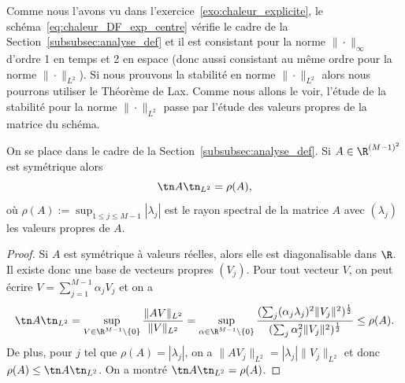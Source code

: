 \documentclass[12pt,a4paper,twoside]{article}
\begin{document}
Comme nous l'avons vu dans l'exercice~\ref{exo:chaleur_explicite},
le sch\'ema~\eqref{eq:chaleur_DF_exp_centre} v\'erifie le cadre
de la Section~\ref{subsubsec:analyse_def} et il est consistant pour la norme $\| \cdot \|_{\infty}$
d'ordre 1 en temps et 2 en espace (donc aussi consistant au m\^eme ordre pour la norme
$\| \cdot \|_{L^2}$). Si nous prouvons la stabilit\'e en norme $\| \cdot \|_{L^2}$
alors nous pourrons utiliser le Th\'eor\`eme de Lax.
Comme nous allons le voir, l'\'etude de la stabilit\'e pour la norme $\| \cdot \|_{L^2}$
passe par l'\'etude des valeurs propres de la matrice du sch\'ema.

\begin{proposition}
  \label{prop:stabL2}
  On se place dans le cadre de la Section~\ref{subsubsec:analyse_def}.
  Si $A \in \R^{(M-1)^2}$ est sym\'etrique alors
  \begin{equation*}
    \tn A \tn_{L^2} = \rho(A) ,
  \end{equation*}
  o\`u $\rho(A) := \sup_{1 \leq j \leq M-1} |\lambda_j|$ est le rayon spectral de la matrice $A$
  avec $(\lambda_j)$ les valeurs propres de $A$.
\end{proposition}

\begin{proof}
  Si $A$ est sym\'etrique \`a valeurs r\'eelles, alors elle est diagonalisable dans $\R$.
  Il existe donc une base de vecteurs propres $(V_j)$.
  Pour tout vecteur $V$, on peut \'ecrire $V = \sum_{j=1}^{M-1} \alpha_j V_j$ et on a
  \begin{align*}
    \tn A \tn_{L^2} = \sup_{V \in \R^{M-1}\setminus\{0\}} \dfrac{\| A V \|_{L^2}}{\| V \|_{L^2}}
    = \sup_{\alpha \in \R^{M-1}\setminus\{0\}}
    \dfrac{(\sum_j (\alpha_j \lambda_j)^2 \| V_j \|^2)^{\frac12}}{(\sum_j \alpha_j^2 \| V_j \|^2)^{\frac12}}
    \leq \rho(A) .
  \end{align*}
  De plus, pour $j$ tel que $\rho(A) = | \lambda_j |$,
  on a $\| A V_j \|_{L^2} = | \lambda_j | \| V_j \|_{L^2}$
  et donc $\rho(A) \leq \tn A \tn_{L^2}$.
  On a montr\'e $\tn A \tn_{L^2} = \rho(A)$.
\end{proof}
\end{document}

